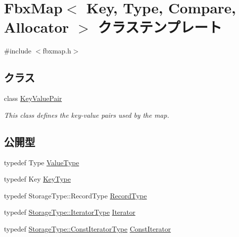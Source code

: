 \hypertarget{class_fbx_map}{}\section{Fbx\+Map$<$ Key, Type, Compare, Allocator $>$ クラステンプレート}
\label{class_fbx_map}


{\ttfamily \#include $<$fbxmap.\+h$>$}

\subsection*{クラス}
\begin{DoxyCompactItemize}
\item 
class \hyperlink{class_fbx_map_1_1_key_value_pair}{Key\+Value\+Pair}
\begin{DoxyCompactList}\small\item\em This class defines the key-\/value pairs used by the map. \end{DoxyCompactList}\end{DoxyCompactItemize}
\subsection*{公開型}
\begin{DoxyCompactItemize}
\item 
typedef Type \hyperlink{class_fbx_map_abea530b1192b31c3cf05fbf247e3dcaa}{Value\+Type}
\item 
typedef Key \hyperlink{class_fbx_map_ad8392c83b6f8eeb9e0706bcc8674270a}{Key\+Type}
\item 
typedef Storage\+Type\+::\+Record\+Type \hyperlink{class_fbx_map_af8fc887461b3bf29f41aa36d15ddb54f}{Record\+Type}
\item 
typedef \hyperlink{class_fbx_red_black_tree_af7b6209131012ec5aa33e0286c956cd6}{Storage\+Type\+::\+Iterator\+Type} \hyperlink{class_fbx_map_ab0989f3b30c0c8652ff9ee1b28b5c1af}{Iterator}
\item 
typedef \hyperlink{class_fbx_red_black_tree_a7309ae5e1bb24e7e3da94fef975d10c4}{Storage\+Type\+::\+Const\+Iterator\+Type} \hyperlink{class_fbx_map_acf89f4bb5cf415e5e04087c2179bf367}{Const\+Iterator}
\end{DoxyCompactItemize}
